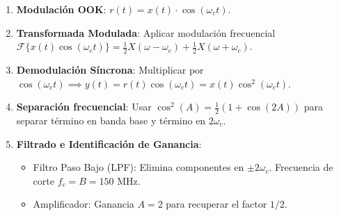 \begin{mecanizado}
\begin{enumerate}
    \item \textbf{Modulación OOK}: $r(t) = x(t) \cdot \cos(\omega_c t)$.
    \item \textbf{Transformada Modulada}: Aplicar modulación frecuencial $\mathcal{F}\{x(t) \cos(\omega_c t)\} = \frac{1}{2} X(\omega - \omega_c) + \frac{1}{2} X(\omega + \omega_c)$.
    \item \textbf{Demodulación Síncrona}: Multiplicar por $\cos(\omega_c t) \implies y(t) = r(t) \cos(\omega_c t) = x(t) \cos^2(\omega_c t)$.
    \item \textbf{Separación frecuencial}: Usar $\cos^2(A) = \frac{1}{2}(1 + \cos(2A))$ para separar término en banda base y término en $2\omega_c$.
    \item \textbf{Filtrado e Identificación de Ganancia}:
    \begin{itemize}
        \item Filtro Paso Bajo (LPF): Elimina componentes en $\pm 2\omega_c$. Frecuencia de corte $f_c = B = 150$ MHz.
        \item Amplificador: Ganancia $A = 2$ para recuperar el factor $1/2$.
    \end{itemize}
\end{enumerate}
\end{mecanizado}

